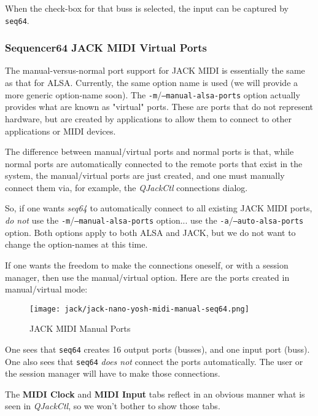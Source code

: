   When the check-box for that buss is selected, the input can be captured by
   \texttt{seq64}.

\subsubsection{Sequencer64 JACK MIDI Virtual Ports}
\label{subsubsec:seq64_jack_midi_virtual_ports}

   The manual-versus-normal port support for JACK MIDI is essentially the same
   as that for ALSA.  Currently, the same option name is used (we will provide
   a more generic option-name soon).
   The \texttt{-m}/\texttt{--manual-alsa-ports} option actually provides what
   are known as "virtual" ports.  These are ports that do not represent
   hardware, but are created by applications to allow them to connect to other
   applications or MIDI devices.

   The difference between manual/virtual ports and normal ports is that, while
   normal ports are automatically connected to the remote ports that exist in
   the system, the manual/virtual ports are just created, and one must
   manually connect them via, for example, the
   \textsl{QJackCtl} connections dialog.

   So, if one wants \textsl{seq64} to automatically connect to all existing
   JACK MIDI ports, \textsl{do not} use the
   \texttt{-m}/\texttt{--manual-alsa-ports} option... use the
   \texttt{-a}/\texttt{--auto-alsa-ports} option.  Both options apply to both
   ALSA and JACK, but we do not want to change the option-names at this time.

   If one wants the freedom to make the connections oneself, or with a session
   manager, then use the manual/virtual option.
   Here are the ports created in manual/virtual mode:

\begin{figure}[H]
   \centering 
   \texttt{[image: jack/jack-nano-yosh-midi-manual-seq64.png]}
   \caption{JACK MIDI Manual Ports}
   \label{fig:seq64_jack_nano_yosh_midi_manual}
\end{figure}

   One sees that \texttt{seq64} creates 16 output ports (busses), and one input
   port (buss).  One also sees that \texttt{seq64} \textsl{does not} connect
   the ports automatically.  The user or the session manager will have to make
   those connections.

   The \textbf{MIDI Clock} and \textbf{MIDI Input} tabs reflect in an obvious
   manner what is seen in \textsl{QJackCtl}, so we won't bother to show those
   tabs.

